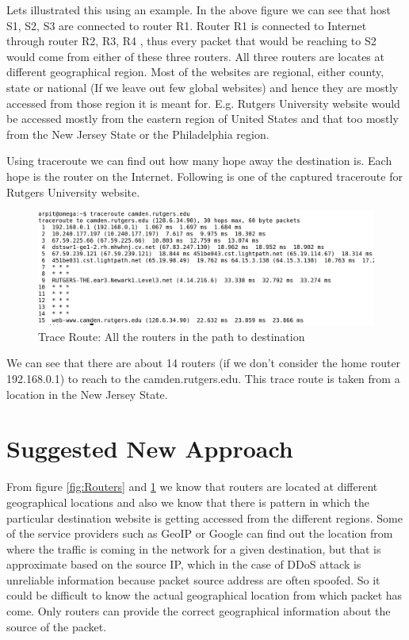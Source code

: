 \documentclass[10pt,oneside,a4paper]{report}
\begin{document}
Lets illustrated this using an example. In the above figure we can see that host S1, S2, S3 are connected to router R1. Router R1 is connected to Internet through router R2, R3, R4 , thus every packet that would be reaching to S2 would come from either of these three routers. All three routers are locates at different geographical region. Most of the websites are regional, either county, state or national (If we leave out few global websites) and hence they are mostly accessed from those region it is meant for. E.g. Rutgers University website would be accessed mostly from the eastern region of United States and that too mostly from the New Jersey State or the Philadelphia region. \par
Using traceroute we can find out how many hope away the destination is. Each hope is the router on the Internet. Following is one of the captured traceroute for Rutgers University website.\par
\begin{figure}[H]
  \label{fig:Traceroute}
  \centering
    \includegraphics[width=\textwidth]{TraceRoute}
      \caption{Trace Route: All the routers in the path to destination}
\end{figure}


We can see that there are about 14 routers (if we don't consider the home router 192.168.0.1) to reach to the camden.rutgers.edu. This trace route is taken from a location in the New Jersey State.


\chapter{Suggested New Approach}
From figure \ref{fig:Routers} and \ref{fig:Traceroute} we know that routers are located at different geographical locations and also we know that there is pattern in which the particular destination website is getting accessed from the different regions. Some of the service providers such as  GeoIP or Google can find out the location from where the traffic is coming in the network for a given destination, but that is approximate based on the source IP, which in the case of DDoS attack is unreliable information because packet source address are often spoofed. So it could be difficult to know the actual geographical location from which packet has come. Only routers can provide the correct geographical information about the source of the packet.\par
\end{document}
